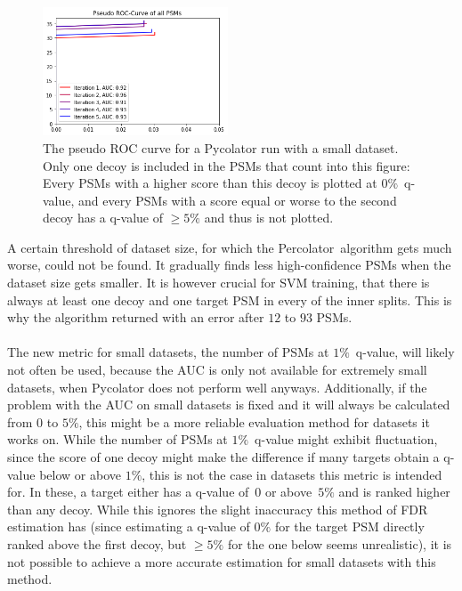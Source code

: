 \renewcommand{\baselinestretch}{0.9}
\begin{figure}
	\normalsize
	\centering
	\includegraphics[width = 0.49\textwidth]{figures/badPseudoROC.png}
	\caption[Pseudo ROC of very small dataset]{The pseudo ROC curve for a Pycolator run with a small dataset. Only one decoy is included in the PSMs that count into this figure: Every PSMs with a higher score than this decoy is plotted at $0\%$~q-value, and every PSMs with a score equal or worse to the second decoy has a q-value of $\geq5\%$ and thus is not plotted.}
	\label{fig:small_dataset_pseudo_ROC}
\end{figure}
\renewcommand{\baselinestretch}{1}
A certain threshold of dataset size, for which the Percolator~algorithm gets much worse, could not be found. It gradually finds less high-confidence PSMs when the dataset size gets smaller. It is however crucial for SVM training, that there is always at least one decoy and one target PSM in every of the inner splits. This is why the algorithm returned with an error after $12$ to $93$ PSMs.\\\\
The new metric for small datasets, the number of PSMs at $1\%$~q-value, will likely not often be used, because the AUC is only not available for extremely small datasets, when Pycolator does not perform well anyways. Additionally, if the problem with the AUC on small datasets is fixed and it will always be calculated from $0$ to $5\%$, this might be a more reliable evaluation method for datasets it works on. While the number of PSMs at $1\%$~q-value might exhibit fluctuation, since the score of one decoy might make the difference if many targets obtain a q-value below or above $1\%$, this is not the case in datasets this metric is intended for. In these, a target either has a q-value of~$0$ or above~$5\%$ and is ranked higher than any decoy. While this ignores the slight inaccuracy this method of FDR estimation has (since estimating a q-value of $0\%$ for the target PSM directly ranked above the first decoy, but $\geq5\%$ for the one below seems unrealistic), it is not possible to achieve a more accurate estimation for small datasets with this method.\\\\%
